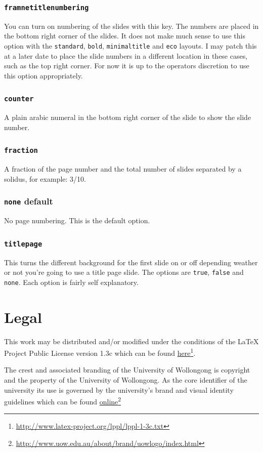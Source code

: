 \documentclass[a4paper,oneside,12pt]{article}
\newcommand{\key}[1]{\texttt{\color{UOWorange}#1}}
\newcommand{\val}[1]{\texttt{\color{UOWblue}#1}}
\begin{document}
\subsubsection*{\key{framnetitlenumbering}}
You can turn on numbering of the slides with this key. The numbers are placed in the bottom right corner of the slides. It does not make much sense to use this option with the \val{standard}, \val{bold}, \val{minimaltitle} and \val{eco} layouts. I may patch this at a later date to place the slide numbers in a different location in these cases, such as the top right corner. For now it is up to the operators discretion to use this option appropriately.

\subsubsection*{\val{counter}}
A plain arabic numeral in the bottom right corner of the slide to show the slide number.

\subsubsection*{\val{fraction}}
A fraction of the page number and the total number of slides separated by a solidus, for example: 3/10.

\subsubsection*{\val{none} default}
No page numbering. This is the default option.


\subsubsection*{\key{titlepage}}
This turns the different background for the first slide on or off depending weather or not you're going to use a title page slide. The options are \val{true}, \val{false} and \val{none}. Each option is fairly self explanatory.


\section{Legal}
This work may be distributed and/or modified under the conditions of the LaTeX Project Public License version 1.3c which can be found \href{http://www.latex-project.org/lppl/lppl-1-3c.txt}{here}\footnote{\url{http://www.latex-project.org/lppl/lppl-1-3c.txt}}.

The crest and associated branding of the University of Wollongong is copyright and the property of the University of Wollongong. As the core identifier of the university its use is governed by the university's brand and visual identity guidelines which can be found \href{http://www.uow.edu.au/about/brand/uowlogo/index.html}{online}\footnote{\url{http://www.uow.edu.au/about/brand/uowlogo/index.html}}
\end{document}
